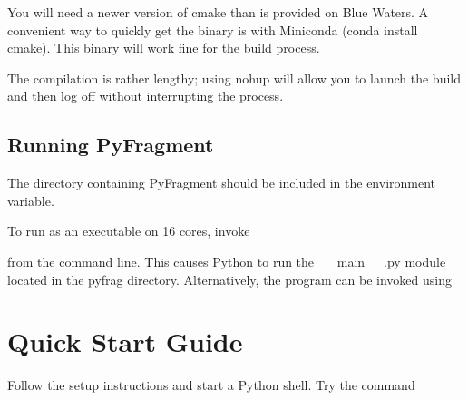 \documentclass[letterpaper,10pt,english]{sphinxmanual}
\begin{document}
You will need a newer version of cmake than is provided on Blue Waters. A
convenient way to quickly get the binary is with Miniconda (conda install
cmake). This binary will work fine for the build process.

\begin{sphinxVerbatim}[commandchars=\\\{\}]
 
  
 
    
\end{sphinxVerbatim}

The compilation is rather lengthy; using nohup will allow you to launch the
build and then log off without interrupting the process.


\subsection{Running PyFragment}
\label{\detokenize{setup:running-pyfragment}}
The directory containing PyFragment should be included in the 
environment variable.

To run as an executable on 16 cores, invoke

\begin{sphinxVerbatim}[commandchars=\\\{\}]
     
\end{sphinxVerbatim}

from the command line. This causes Python to run the \_\_main\_\_.py module
located in the pyfrag directory. Alternatively, the program can be invoked
using

\begin{sphinxVerbatim}[commandchars=\\\{\}]
      
\end{sphinxVerbatim}


\section{Quick Start Guide}
\label{\detokenize{quickstart:quick-start-guide}}\label{\detokenize{quickstart::doc}}
Follow the setup instructions and start a Python shell.  Try the
command
\end{document}
